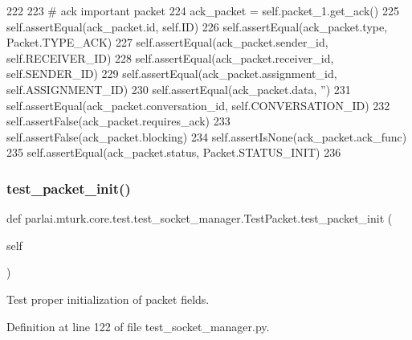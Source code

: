 \begin{DoxyCode}
222 
223         \textcolor{comment}{# ack important packet}
224         ack\_packet = self.packet\_1.get\_ack()
225         self.assertEqual(ack\_packet.id, self.ID)
226         self.assertEqual(ack\_packet.type, Packet.TYPE\_ACK)
227         self.assertEqual(ack\_packet.sender\_id, self.RECEIVER\_ID)
228         self.assertEqual(ack\_packet.receiver\_id, self.SENDER\_ID)
229         self.assertEqual(ack\_packet.assignment\_id, self.ASSIGNMENT\_ID)
230         self.assertEqual(ack\_packet.data, \textcolor{stringliteral}{''})
231         self.assertEqual(ack\_packet.conversation\_id, self.CONVERSATION\_ID)
232         self.assertFalse(ack\_packet.requires\_ack)
233         self.assertFalse(ack\_packet.blocking)
234         self.assertIsNone(ack\_packet.ack\_func)
235         self.assertEqual(ack\_packet.status, Packet.STATUS\_INIT)
236 
\end{DoxyCode}
\mbox{\label{classparlai_1_1mturk_1_1core_1_1test_1_1test__socket__manager_1_1TestPacket_ac2906b50dddbfba35c3909ca83c34bf7}} 
\subsubsection{\texorpdfstring{test\+\_\+packet\+\_\+init()}{test\_packet\_init()}}
{\footnotesize\ttfamily def parlai.\+mturk.\+core.\+test.\+test\+\_\+socket\+\_\+manager.\+Test\+Packet.\+test\+\_\+packet\+\_\+init (\begin{DoxyParamCaption}\item[{}]{self }\end{DoxyParamCaption})}

\begin{DoxyVerb}Test proper initialization of packet fields.
\end{DoxyVerb}
 

Definition at line 122 of file test\+\_\+socket\+\_\+manager.\+py.


